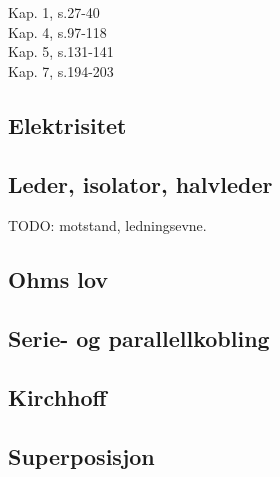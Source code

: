Kap. 1, s.27-40 \\
Kap. 4, s.97-118 \\
Kap. 5, s.131-141 \\
Kap. 7, s.194-203

\subsection{Elektrisitet}




\subsection{Leder, isolator, halvleder}
TODO: motstand, ledningsevne.

\subsection{Ohms lov}


\subsection{Serie- og parallellkobling}


\subsection{Kirchhoff}


\subsection{Superposisjon}

